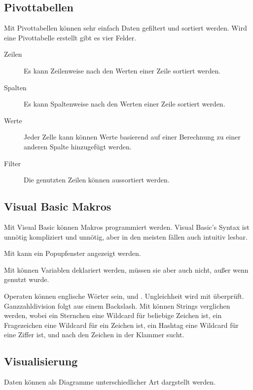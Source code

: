 \documentclass{article}
\begin{document}
\subsection{Pivottabellen}
Mit Pivottabellen können sehr einfach Daten gefiltert und sortiert werden. Wird eine Pivottabelle erstellt gibt es vier Felder.
\begin{description}
 \item[Zeilen] Es kann Zeilenweise nach den Werten einer Zeile sortiert werden.
 \item[Spalten] Es kann Spaltenweise nach den Werten einer Zeile sortiert werden.
 \item[Werte] Jeder Zelle kann können Werte basierend auf einer Berechnung zu einer anderen Spalte hinzugefügt werden.
 \item[Filter] Die genutzten Zeilen können aussortiert werden.
\end{description}

\subsection{Visual Basic Makros}
Mit Visual Basic können Makros programmiert werden. Visual Basic's Syntax ist unnötig kompliziert und unnötig, aber in den meisten fällen auch intuitiv lesbar.

Mit  kann ein Popupfenster angezeigt werden.

Mit  können Variablen deklariert werden, müssen sie aber auch nicht, außer wenn  genutzt wurde.

Operaten können englische Wörter sein, \ua {} und . Ungleichheit wird mit \vb{<>} überprüft. Ganzzahldivision folgt aus einem Backslash. Mit  können Strings verglichen werden, wobei ein Sternchen eine Wildcard für beliebige Zeichen ist, ein Fragezeichen eine Wildcard für ein Zeichen ist, ein Hashtag eine Wildcard für eine Ziffer ist, und \vb{[...]} nach den Zeichen in der Klammer sucht.

\subsection{Visualisierung}
Daten können als Diagramme unterschiedlicher Art dargstellt werden.
\end{document}

